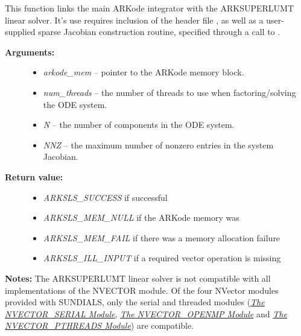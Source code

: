 \documentclass[letterpaper,10pt,english]{sphinxmanual}
\begin{document}

\begin{fulllineitems}
\label{c_interface/User_callable:ARKSuperLUMT}
This function links the main ARKode integrator with the ARKSUPERLUMT
linear solver.  It's use requires inclusion of the header file
, as well as a user-supplied sparse Jacobian
construction routine, specified through a call to
{\hyperref[c_interface/User_callable:ARKSlsSetSparseJacFn]{}}.
\begin{description}
\item[{\textbf{Arguments:}}] \leavevmode\begin{itemize}
\item {} 
\emph{arkode\_mem} -- pointer to the ARKode memory block.

\item {} 
\emph{num\_threads} -- the number of threads to use when
factoring/solving the ODE system.

\item {} 
\emph{N} -- the number of components in the ODE system.

\item {} 
\emph{NNZ} -- the maximum number of nonzero entries in the system
Jacobian.

\end{itemize}

\item[{\textbf{Return value:}}] \leavevmode\begin{itemize}
\item {} 
\emph{ARKSLS\_SUCCESS}   if successful

\item {} 
\emph{ARKSLS\_MEM\_NULL}  if the ARKode memory was 

\item {} 
\emph{ARKSLS\_MEM\_FAIL}  if there was a memory allocation failure

\item {} 
\emph{ARKSLS\_ILL\_INPUT} if a required vector operation is missing

\end{itemize}

\end{description}

\textbf{Notes:}  The ARKSUPERLUMT linear solver is not compatible with
all implementations of the NVECTOR module.  Of the four NVector
modules provided with SUNDIALS, only the serial and threaded
modules ({\hyperref[nvectors/NVector_Serial:nvectors-nvserial]{\emph{The NVECTOR\_SERIAL Module}}}, {\hyperref[nvectors/NVector_OpenMP:nvectors-openmp]{\emph{The NVECTOR\_OPENMP Module}}} and
{\hyperref[nvectors/NVector_Pthreads:nvectors-pthreads]{\emph{The NVECTOR\_PTHREADS Module}}}) are compatible.

\end{fulllineitems}
\end{document}
